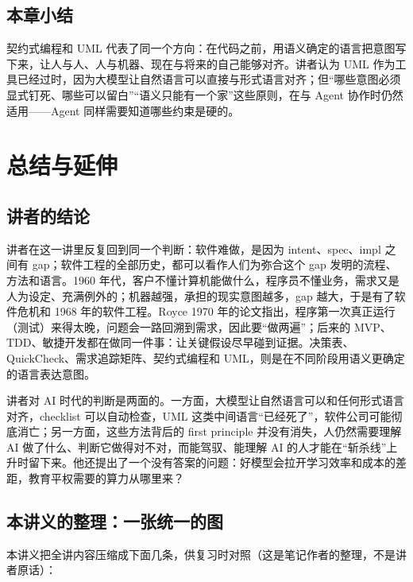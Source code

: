 \documentclass[a4paper]{article}
\begin{document}
\subsection{本章小结}

契约式编程和 UML 代表了同一个方向：在代码之前，用语义确定的语言把意图写下来，让人与人、人与机器、现在与将来的自己能够对齐。讲者认为 UML 作为工具已经过时，因为大模型让自然语言可以直接与形式语言对齐；但“哪些意图必须显式钉死、哪些可以留白”“语义只能有一个家”这些原则，在与 Agent 协作时仍然适用——Agent 同样需要知道哪些约束是硬的。

\section{总结与延伸}

\subsection{讲者的结论}

讲者在这一讲里反复回到同一个判断：软件难做，是因为 intent、spec、impl 之间有 gap；软件工程的全部历史，都可以看作人们为弥合这个 gap 发明的流程、方法和语言。1960 年代，客户不懂计算机能做什么，程序员不懂业务，需求又是人为设定、充满例外的；机器越强，承担的现实意图越多，gap 越大，于是有了软件危机和 1968 年的软件工程。Royce 1970 年的论文指出，程序第一次真正运行（测试）来得太晚，问题会一路回溯到需求，因此要“做两遍”；后来的 MVP、TDD、敏捷开发都在做同一件事：让关键假设尽早碰到证据。决策表、QuickCheck、需求追踪矩阵、契约式编程和 UML，则是在不同阶段用语义更确定的语言表达意图。

讲者对 AI 时代的判断是两面的。一方面，大模型让自然语言可以和任何形式语言对齐，checklist 可以自动检查，UML 这类中间语言“已经死了”，软件公司可能彻底消亡；另一方面，这些方法背后的 first principle 并没有消失，人仍然需要理解 AI 做了什么、判断它做得对不对，而能驾驭、能理解 AI 的人才能在“斩杀线”上升时留下来。他还提出了一个没有答案的问题：好模型会拉开学习效率和成本的差距，教育平权需要的算力从哪里来？

\subsection{本讲义的整理：一张统一的图}

本讲义把全讲内容压缩成下面几条，供复习时对照（这是笔记作者的整理，不是讲者原话）：
\end{document}
